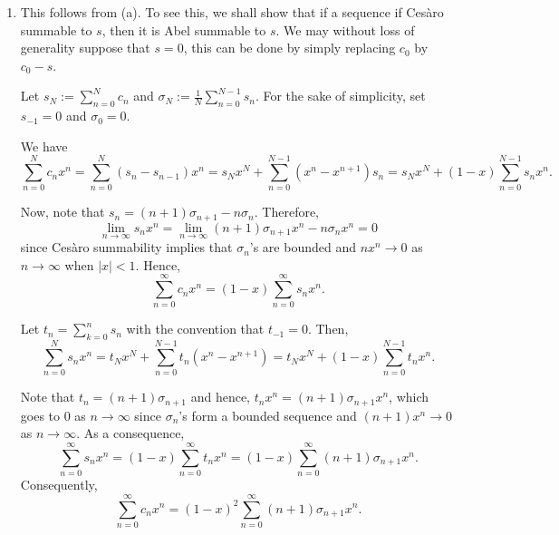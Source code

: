 \documentclass[12pt]{amsart}
\begin{document}
\begin{enumerate}[label=(\alph*)]
\item This follows from (a). To see this, we shall show that if a sequence if Ces\`aro summable to $s$, then it is Abel summable to $s$. We may without loss of generality suppose that $s = 0$, this can be done by simply replacing $c_0$ by $c_0 - s$.

Let $s_N := \sum_{n = 0}^N c_n$ and $\sigma_N := \frac{1}{N}\sum_{n = 0}^{N - 1} s_n$. For the sake of simplicity, set $s_{-1} = 0$ and $\sigma_0 = 0$.

We have 
\begin{equation*}
	\sum_{n = 0}^N c_n x^n = \sum_{n = 0}^{N} (s_n - s_{n - 1})x^n = s_Nx^N + \sum_{n = 0}^{N - 1}(x^n - x^{n + 1})s_n = s_Nx^N + (1 - x)\sum_{n = 0}^{N - 1}s_nx^n.
\end{equation*}

Now, note that $s_n = (n + 1)\sigma_{n + 1} - n\sigma_n$. Therefore, 
\begin{equation*}
	\lim_{n\to\infty} s_nx^n = \lim_{n\to\infty}(n + 1)\sigma_{n + 1}x^n - n\sigma_nx^n = 0
\end{equation*}
since Ces\`aro summability implies that $\sigma_n$'s are bounded and $nx^n\to 0$ as $n\to\infty$ when $|x| < 1$. Hence, 
\begin{equation*}
	\sum_{n = 0}^\infty c_nx^n = (1 - x)\sum_{n = 0}^\infty s_nx^n.
\end{equation*}

Let $t_n = \sum_{k = 0}^n s_n$ with the convention that $t_{-1} = 0$. Then, 
\begin{equation*}
	\sum_{n = 0}^N s_nx^n = t_Nx^N + \sum_{n = 0}^{N - 1}t_n(x^n - x^{n + 1}) = t_Nx^N + (1 - x)\sum_{n = 0}^{N - 1}t_nx^n.
\end{equation*}

Note that $t_n = (n + 1)\sigma_{n + 1}$ and hence, $t_nx^n = (n + 1)\sigma_{n + 1}x^n$, which goes to $0$ as $n\to\infty$ since $\sigma_n$'s form a bounded sequence and $(n + 1)x^n\to 0$ as $n\to\infty$. As a consequence, 
\begin{equation*}
	\sum_{n = 0}^\infty s_nx^n = (1 - x)\sum_{n = 0}^\infty t_n x^n = (1 - x)\sum_{n = 0}^\infty (n + 1)\sigma_{n + 1}x^n.
\end{equation*}
Consequently,
\begin{equation*}
	\sum_{n = 0}^\infty c_nx^n = (1 - x)^2\sum_{n = 0}^\infty (n + 1)\sigma_{n + 1}x^n.
\end{equation*}


\end{enumerate}
\end{document}
